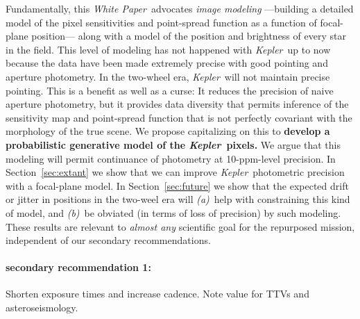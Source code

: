 \documentclass[12pt]{article}
\newcommand{\sectionname}{Section}
\newcommand{\documentname}{\textsl{White Paper}}
\newcommand{\observatory}[1]{\textsl{#1}}
\newcommand{\kepler}{\observatory{Kepler}}
\newcommand{\Kepler}{\kepler}
\begin{document}
Fundamentally, this \documentname\ advocates \emph{image modeling}%
  ---building a detailed model of the pixel sensitivities and point-spread function
  as a function of focal-plane position---%
  along with a model of the position and brightness of every star in the field.
This level of modeling has not happened with \Kepler\ up to now
  because the data have been made extremely precise with good pointing
  and aperture photometry.
In the two-wheel era, \Kepler\ will not maintain precise pointing.
This is a benefit as well as a curse:
It reduces the precision of naive aperture photometry,
  but it provides data diversity that permits inference
  of the sensitivity map and point-spread function
  that is not perfectly covariant with the morphology of the true scene.
We propose capitalizing on this to
  \textbf{develop a probabilistic generative model of the \Kepler\ pixels.}
We argue that this modeling will permit continuance of photometry at 10-ppm-level precision.
In \sectionname~\ref{sec:extant} we show that we can improve \Kepler\ photometric precision with a focal-plane model.
In \sectionname~\ref{sec:future} we show that the expected drift or jitter in positions in the two-weel era
  will \textsl{(a)}~help with constraining this kind of model,
  and \textsl{(b)}~be obviated (in terms of loss of precision) by such modeling.
These results are relevant to \emph{almost any} scientific goal for the repurposed mission,
  independent of our secondary recommendations.

\paragraph{secondary recommendation 1:}
Shorten exposure times and increase cadence.
Note value for TTVs and asteroseismology.
\end{document}
